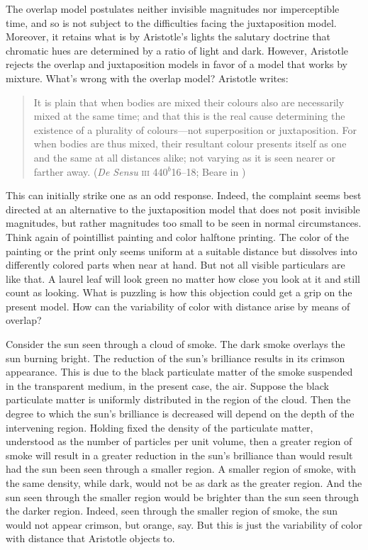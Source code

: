 The overlap model postulates neither invisible magnitudes nor imperceptible time, and so is not subject to the difficulties facing the juxtaposition model. Moreover, it retains what is by Aristotle's lights the salutary doctrine that chromatic hues are determined by a ratio of light and dark. However, Aristotle rejects the overlap and juxtaposition models in favor of a model that works by mixture. What's wrong with the overlap model? Aristotle writes:
\begin{quote}
	It is plain that when bodies are mixed their colours also are necessarily mixed at the same time; and that this is the real cause determining the existence of a plurality of colours—not superposition or juxtaposition. For when bodies are thus mixed, their resultant colour presents itself as one and the same at all distances alike; not varying as it is seen nearer or farther away. (\emph{De Sensu} \textsc{iii} 440\( ^{b} \)16--18; Beare in \citealt[10]{Barnes:1984uq})
\end{quote}
This can initially strike one as an odd response. Indeed, the complaint seems best directed at an alternative to the juxtaposition model that does not posit invisible magnitudes, but rather magnitudes too small to be seen in normal circumstances. Think again of pointillist painting and color halftone printing. The color of the painting or the print only seems uniform at a suitable distance but dissolves into differently colored parts when near at hand. But not all visible particulars are like that. A laurel leaf will look green no matter how close you look at it and still count as looking. What is puzzling is how this objection could get a grip on the present model. How can the variability of color with distance arise by means of overlap?

Consider the sun seen through a cloud of smoke. The dark smoke overlays the sun burning bright. The reduction of the sun's brilliance results in its crimson appearance. This is due to the black particulate matter of the smoke suspended in the transparent medium, in the present case, the air. Suppose the black particulate matter is uniformly distributed in the region of the cloud. Then the degree to which the sun's brilliance is decreased will depend on the depth of the intervening region. Holding fixed the density of the particulate matter, understood as the number of particles per unit volume, then a greater region of smoke will result in a greater reduction in the sun's brilliance than would result had the sun been seen through a smaller region. A smaller region of smoke, with the same density, while dark, would not be as dark as the greater region. And the sun seen through the smaller region would be brighter than the sun seen through the darker region. Indeed, seen through the smaller region of smoke, the sun would not appear crimson, but orange, say. But this is just the variability of color with distance that Aristotle objects to.

